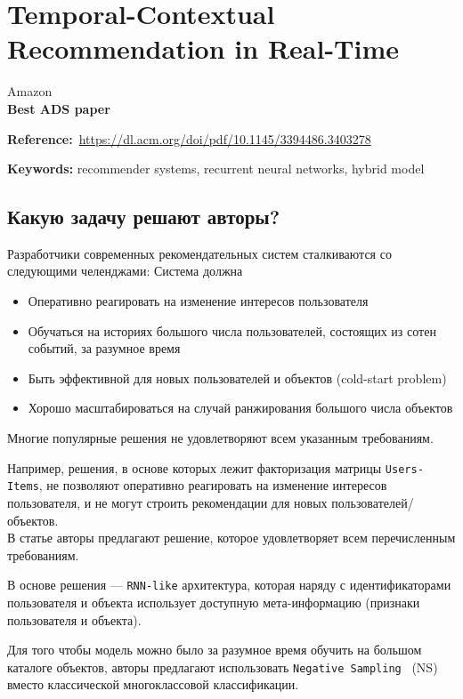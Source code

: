 \chapter{Temporal-Contextual Recommendation in Real-Time}

Amazon \\

\textbf{Best ADS paper}

\textbf{Reference:}~\url{https://dl.acm.org/doi/pdf/10.1145/3394486.3403278}

\textbf{Keywords:} recommender systems, recurrent neural networks, hybrid model

\section*{Какую задачу решают авторы?}

Разработчики современных рекомендательных систем сталкиваются со следующими челенджами: Система должна

\begin{itemize}
    \item Оперативно реагировать на изменение интересов пользователя
    \item Обучаться на историях большого числа пользователей, состоящих из сотен событий, за разумное время
    \item Быть эффективной для новых пользователей и объектов (cold-start problem)
    \item Хорошо масштабироваться на случай ранжирования большого числа объектов
\end{itemize}

Многие популярные решения не удовлетворяют всем указанным требованиям. 

Например, решения, в основе которых лежит факторизация матрицы \texttt{Users-Items}, не позволяют оперативно реагировать на изменение интересов пользователя, и не могут строить рекомендации для новых пользователей/объектов. \\

В статье авторы предлагают решение, которое удовлетворяет всем перечисленным требованиям.

В основе решения --- \texttt{RNN-like} архитектура, которая наряду с идентификаторами пользователя и объекта использует доступную мета-информацию (признаки пользователя и объекта).

Для того чтобы модель можно было за разумное время обучить на большом каталоге объектов, авторы предлагают использовать \texttt{Negative Sampling}~\cite{mikolov2013distributed} (NS) вместо классической многоклассовой классификации.

